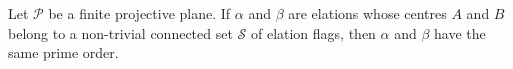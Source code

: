 Let $\mathcal{P}$ be a finite projective plane. If $\alpha$ and $\beta$ are elations whose centres $A$ and $B$ belong to a non-trivial connected set $\mathcal{S}$ of elation flags, then $\alpha$ and $\beta$ have the same prime order.

